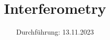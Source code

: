 

\subject{V64}
\title{Interferometry}
\date{%
  Durchführung: 13.11.2023
}



\maketitle
\thispagestyle{empty}
\tableofcontents
\newpage






\printbibliography{}

\appendix
\newpage



